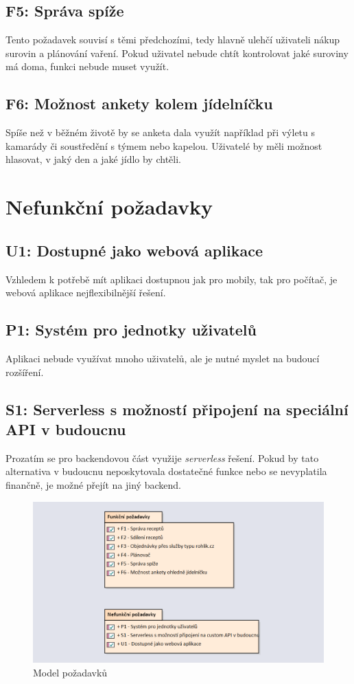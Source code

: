 \subsection{F5: Správa spíže}
Tento požadavek souvisí s těmi předchozími, tedy hlavně ulehčí uživateli nákup surovin a plánování vaření. Pokud uživatel nebude chtít
kontrolovat jaké suroviny má doma, funkci nebude muset využít.
\subsection{F6: Možnost ankety kolem jídelníčku}
Spíše než v běžném životě by se anketa dala využít například při výletu s kamarády či soustředění s týmem nebo kapelou. Uživatelé
by měli možnost hlasovat, v jaký den a jaké jídlo by chtěli.

\section{Nefunkční požadavky}

\subsection{U1: Dostupné jako webová aplikace}
Vzhledem k potřebě mít aplikaci dostupnou jak pro mobily, tak pro počítač, je webová aplikace nejflexibilnější řešení.
\subsection{P1: Systém pro jednotky uživatelů}
Aplikaci nebude využívat mnoho uživatelů, ale je nutné myslet na budoucí rozšíření.
\subsection{S1: Serverless s možností připojení na speciální API v budoucnu}
Prozatím se pro backendovou část využije \emph{serverless} řešení. Pokud by tato alternativa v budoucnu neposkytovala dostatečné
funkce nebo se nevyplatila finančně, je možné přejít na jiný backend.

\begin{figure}[h]
    \includegraphics[width=\textwidth]{images/pozadavky}
    \caption{Model požadavků} \label{picture:recipeo:pozadavky}
\end{figure}

